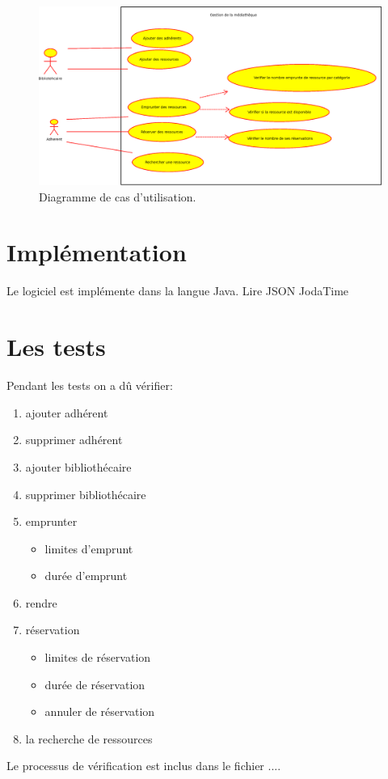 \documentclass[10pt, a4paper]{article}
\begin{document}
    		 \begin{figure}[h]
			\begin{center}
				\includegraphics[width=1\textwidth]{graphics/usecasediagram.eps}
				\caption{Diagramme de cas d'utilisation.}
			\end{center}
		\end{figure}
	
	\section{Implémentation}
	Le logiciel est implémente dans la langue Java.
	Lire
	JSON
	JodaTime
	
	\section{Les tests}
	Pendant les tests on a dû vérifier:
	\begin{enumerate}
		\item ajouter adhérent
		\item supprimer adhérent
		\item ajouter bibliothécaire
		\item supprimer bibliothécaire
		\item emprunter
		\begin{itemize}
			\item limites d'emprunt
			\item durée d'emprunt
		\end{itemize}
		\item rendre
		\item réservation
		\begin{itemize}
			\item limites de réservation
			\item durée de réservation
			\item annuler de réservation
		\end{itemize}
		\item la recherche de ressources 
	\end{enumerate}
	Le processus de vérification est inclus dans le fichier ....
\end{document}

